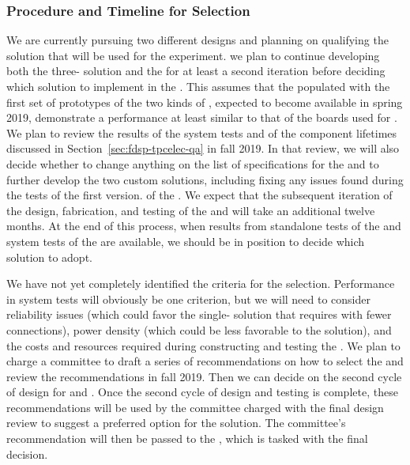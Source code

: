 \subsubsection{Procedure and Timeline for  Selection}
\label{sec:fdsp-tpcelec-design-femb-selection}

We are currently pursuing two different  designs and 
planning on qualifying the   solution that 
will be used for the  experiment. %
we plan to continue developing both the three- 
solution and the   for at least a second 
iteration before deciding which  solution to %
implement in the  . %
This assumes that 
the  populated with the first set of prototypes of 
the two kinds of , expected to become available in 
spring 2019, demonstrate a performance at least similar to that 
of the boards used for  . We plan to review the results of the system tests and of the
component lifetimes discussed in Section~\ref{sec:fdsp-tpcelec-qa} in fall 
2019. 
In that review, we will also decide whether to change anything on 
the list of specifications %
for the  and to further develop
the two custom  solutions, including fixing any 
issues found during the tests of the first version.  of the . 
We expect that the subsequent iteration
of the design, fabrication, and testing of the  and
 will take an additional twelve months. At the end 
of this process, when results from standalone tests of the
 and system tests of the  are
available, we should be in position to decide which 
solution to adopt. %

We have not yet completely identified the %
criteria for the 
 selection. Performance in system tests will obviously
be one criterion, but we will need to consider reliability 
issues (which could favor the single- solution 
that requires  with fewer connections), power 
density (which could be less favorable to the  solution),
and the costs and resources required during constructing 
and testing the . We plan to charge a committee
to draft a series of recommendations on how to select the
 and review the recommendations in fall
2019. Then we can %
decide on the second cycle of design for
 and . Once the second cycle of design
and testing is complete, these recommendations will be used by the
committee charged with the final design review to suggest a
preferred option for the  solution. %
The committee's recommendation %
will then be passed to the  , 
which is tasked with the final  decision.

